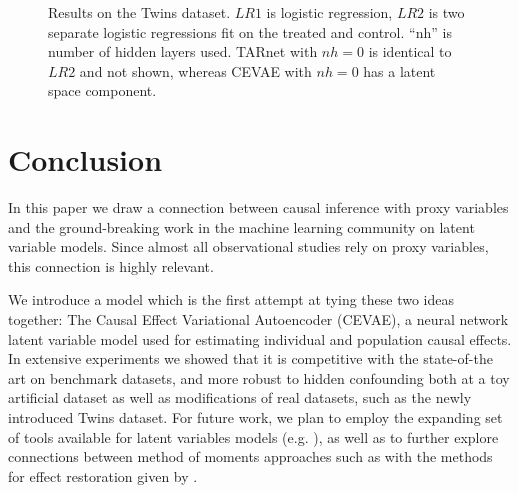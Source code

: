 \documentclass{article}
\begin{document}
\begin{figure*}[htb!]
\centering
\hspace*{\fill}\hfill {}
 \hspace*{\fill}\caption{Results on the Twins dataset. $LR1$ is logistic regression, $LR2$ is two separate logistic regressions fit on the treated and control. ``nh'' is number of hidden layers used. TARnet with $nh=0$ is identical to $LR2$ and not shown, whereas CEVAE with $nh=0$ has a latent space component.}
 \label{fig:twins}
 \vskip -10pt
\end{figure*}
 
\section{Conclusion}
\vskip -10pt
In this paper we draw a connection between causal inference with proxy variables and the ground-breaking work in the machine learning community on latent variable models. Since almost all observational studies rely on proxy variables, this connection is highly relevant.

We introduce a model which is the first attempt at tying these two ideas together: The Causal Effect Variational Autoencoder (CEVAE), a neural network latent variable model used for estimating individual and population causal effects. In extensive experiments we showed that it is competitive with the state-of-the art on benchmark datasets, and more robust to hidden confounding both at a toy artificial dataset as well as modifications of real datasets, such as the newly introduced Twins dataset. 
For future work, we plan to employ the expanding set of tools available for latent variables models (e.g. \citet{kingma2016improving,tran2015variational,maaloe2016auxiliary,ranganath2016operator}), as well as to further explore connections between method of moments approaches such as \citet{anandkumar2014tensor} with the methods for effect restoration given by \citet{kuroki2014measurement,miao2016identifying}. 
\end{document}
